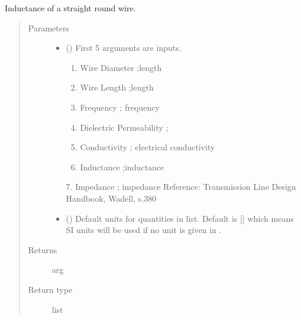 \documentclass[letterpaper,10pt,english]{sphinxmanual}
\begin{document}

\begin{fulllineitems}
\label{\detokenize{components:components.L_StraightRoundWire}}
Inductance of a straight round wire.
\begin{quote}\begin{description}
\item[{Parameters}] \leavevmode\begin{itemize}
\item {} 
 () \textendash{} 
First 5 arguments are inputs.
\begin{enumerate}
%
\item {} 
Wire Diameter ;length

\item {} 
Wire Length ;length

\item {} 
Frequency ; frequency

\item {} 
Dielectric Permeability  ;

\item {} 
Conductivity ; electrical conductivity

\item {} 
Inductance ;inductance

\end{enumerate}

7. Impedance ; impedance
Reference:  Transmission Line Design Handbook, Wadell, s.380


\item {} 
 (\sphinxstyleliteralemphasis{\sphinxupquote{, }}) \textendash{} Default units for quantities in  list. Default is {[}{]} which means SI units will be used if no unit is given in .

\end{itemize}

\item[{Returns}] \leavevmode
arg

\item[{Return type}] \leavevmode
list

\end{description}\end{quote}

\end{fulllineitems}
\end{document}
